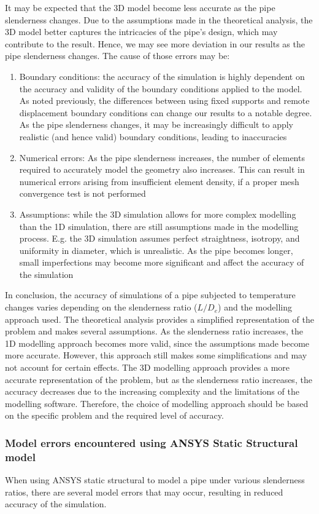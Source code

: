 It may be expected that the 3D model become less accurate as the pipe slenderness changes. Due to the assumptions made in the theoretical analysis, the 3D model better captures the intricacies of the pipe's design, which may contribute to the result. Hence, we may see more deviation in our results as the pipe slenderness changes. The cause of those errors may be:
\begin{enumerate}
    \item Boundary conditions: the accuracy of the simulation is highly dependent on the accuracy and validity of the boundary conditions applied to the model. As noted previously, the differences between using fixed supports and remote displacement boundary conditions can change our results to a notable degree. As the pipe slenderness changes, it may be increasingly difficult to apply realistic (and hence valid) boundary conditions, leading to inaccuracies
    \item Numerical errors: As the pipe slenderness increases, the number of elements required to accurately model the geometry also increases. This can result in numerical errors arising from insufficient element density, if a proper mesh convergence test is not performed
    \item Assumptions: while the 3D simulation allows for more complex modelling than the 1D simulation, there are still assumptions made in the modelling process. E.g. the 3D simulation assumes perfect straightness, isotropy, and uniformity in diameter, which is unrealistic. As the pipe becomes longer, small imperfections may become more significant and affect the accuracy of the simulation
\end{enumerate}
In conclusion, the accuracy of simulations of a pipe subjected to temperature changes varies depending on the slenderness ratio ($L/D_e$) and the modelling approach used. The theoretical analysis provides a simplified representation of the problem and makes several assumptions. As the slenderness ratio increases, the 1D modelling approach becomes more valid, since the assumptions made become more accurate. However, this approach still makes some simplifications and may not account for certain effects. The 3D modelling approach provides a more accurate representation of the problem, but as the slenderness ratio increases, the accuracy decreases due to the increasing complexity and the limitations of the modelling software. Therefore, the choice of modelling approach should be based on the specific problem and the required level of accuracy.
\subsubsection{Model errors encountered using ANSYS Static Structural model}
When using ANSYS static structural to model a pipe under various slenderness ratios, there are several model errors that may occur, resulting in reduced accuracy of the simulation.

